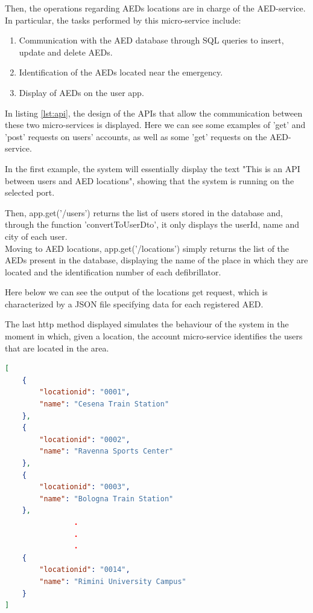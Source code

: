 \documentclass[11pt,a4paper]{article}
\begin{document}
Then, the operations regarding AEDs locations are in charge of the AED-service. 
%
In particular, the tasks performed by this micro-service include:

\begin{enumerate}
    \item Communication with the AED database through SQL queries to insert, update and delete AEDs.
    \item Identification of the AEDs located near the emergency.
    \item Display of AEDs on the user app.
\end{enumerate}

In listing \ref{lst:api}, the design of the APIs that allow the communication between these two micro-services is displayed.
%
Here we can see some examples of 'get' and 'post' requests on users' accounts, as well as some 'get' requests on the AED-service.

In the first example, the system will essentially display the text "This is an API between users and AED locations", showing that the system is running on the selected port.

Then, app.get('/users') returns the list of users stored in the database and, through the function 'convertToUserDto', it only displays the userId, name and city of each user. \\



Moving to AED locations, app.get('/locations') simply returns the list of the AEDs present in the database, displaying the name of the place in which they are located and the identification number of each defibrillator.

Here below we can see the output of the locations get request, which is characterized by a JSON file specifying data for each registered AED.

The last http method displayed simulates the behaviour of the system in the moment in which, given a location, the account micro-service identifies the users that are located in the area.

\newpage

\begin{lstlisting}[language=JSON]
[
    {
        "locationid": "0001",
        "name": "Cesena Train Station"
    },
    {
        "locationid": "0002",
        "name": "Ravenna Sports Center"
    },
    {
        "locationid": "0003",
        "name": "Bologna Train Station"
    },
                .
                .
                .
    {
        "locationid": "0014",
        "name": "Rimini University Campus"
    }
]
\end{lstlisting}
\end{document}

